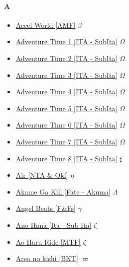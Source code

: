 		\paragraph{A} \hypertarget{SA}{}
			\begin{itemize}
				\item \href{https://mega.nz/#F!iswSTaLS!jvqE9rSl38YR9x-mFE1p1Q} {Accel World [AMF]}  $\beta$ \\ 
				\item \href{https://mega.nz/#F!wmIiGCRJ!YwH4ZQ9qj--3kXY1LJ6G1Q} {Adventure Time 1 [ITA - SubIta]}  $\varOmega$ \\ 
				\item \href{https://mega.nz/#F!0qRmDLDA!tZeMa5v3K8brynRgCHy3vw} {Adventure Time 2 [ITA - SubIta]}  $\varOmega$ \\ 
				\item \href{https://mega.nz/#F!g3pnUK6a!KtqPneIzqaLfpm_jVtT6KA} {Adventure Time 3 [ITA - SubIta]}  $\varOmega$ \\
				\item \href{https://mega.nz/#F!VqphmKKK!RVj6qmb-zXs2NISW66ZHbQ} {Adventure Time 4 [ITA - SubIta]}  $\varOmega$ \\
				\item \href{https://mega.nz/#F!p2BDTT4D!0Cnl6k6vbpsdb7P1qyfMWw} {Adventure Time 5 [ITA - SubIta]}  $\varOmega$ \\
				\item \href{https://mega.nz/#F!pupBwSrZ!TIILLs41X-lH1l9bx00BJg} {Adventure Time 6 [ITA - SubIta]}  $\varOmega$ \\
				\item \href{https://mega.nz/#F!VvoEmY4Y!yD848AsLXXYa5WpUkpkoXA} {Adventure Time 7 [ITA - SubIta]}  $\varOmega$ \\
				\item \href{https://mega.nz/#F!JvBAyLQY!_n4xTNpeg3OSLM-MvMGKZg} {Adventure Time 8 [ITA - SubIta]}  $\sharp$ \\
				\item \href{https://mega.nz/#F!iswSTaLS!jvqE9rSl38YR9x-mFE1p1Q} {Air [NTA \& Oki]}  $\eta$ \\ 
				\item \href{https://mega.nz/#F!lO4ylLBZ!wOnf7oIthfMXZmCxE_RW2g} {Akame Ga Kill [Fate - Akuma]}  $\varLambda$ \\
				\item \href{https://mega.nz/#F!hthUVJIL!FOiKbp_VG3LcnM2J3q4HXA} {Angel Beats [F\&Fs]}  $\gamma$ \\ 
				\item \href{https://mega.nz/#F!2sFESBKQ!0d7Y2qwcVAo9Rmbs1soAIw} {Ano Hana [Ita - Sub Ita]}  $\zeta$ \\ 
				\item \href{https://mega.nz/#F!WtNWxQrA!Mn2r9-vBP2rwo0jIFnKR-w} {Ao Haru Ride [MTF]}  $\zeta$ \\ 
				\item \href{https://mega.nz/#F!7ZMn1T5A!z-Jk0ZIhm9RxhM55LKbHyA} {Area no kishi [BKT]}  $\varpi$ \\ 
			\end{itemize}
			
